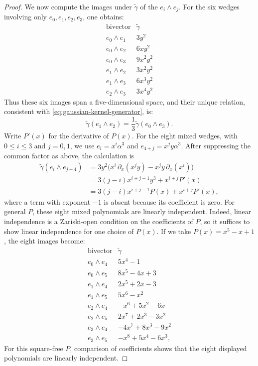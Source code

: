 \documentclass[11pt]{article}
\begin{document}
\begin{proof}
We now compute the images under $\widetilde \gamma$ of the $e_i \wedge e_j$.
For the six wedges involving only $e_0,e_1,e_2,e_3$, one obtains:
\begin{equation*}
\begin{array}{c|c}
\text{bivector} & \widetilde\gamma \\ \hline
 e_0\wedge e_1 & 3y^2 \\
 e_0\wedge e_2 & 6xy^2 \\
 e_0\wedge e_3 & 9x^2y^2 \\
 e_1\wedge e_2 & 3x^2y^2 \\
 e_1\wedge e_3 & 6x^3y^2 \\
 e_2\wedge e_3 & 3x^4y^2
\end{array}
\end{equation*}
Thus these six images span a five-dimensional space, and their unique relation,
consistent with \eqref{eq:gaussian-kernel-generator}, is:
\begin{equation*}
\widetilde\gamma(e_1\wedge e_2)
=\frac13\widetilde\gamma(e_0\wedge e_3).
\end{equation*}
Write $P'(x)$ for the derivative of $P(x)$.  For the eight mixed wedges,
with $0\leq i\leq3$ and $j=0,1$, we use
$e_i=x^i\alpha^3$ and $e_{4+j}=x^jy\alpha^3$.  After suppressing the
common factor as above, the calculation is
\begin{equation}
\label{eq:mixed-gaussian-general-P}
\begin{aligned}
\widetilde\gamma (e_i \wedge e_{j+4})
&=
3y^2\bigl(x^i\,\partial_x(x^jy)-x^jy\,\partial_x(x^i)\bigr) \\
&=
3(j-i)x^{i+j-1}y^3+x^{i+j}P'(x) \\
&=
3(j-i)x^{i+j-1}P(x)+x^{i+j}P'(x),
\end{aligned}
\end{equation}
where a term with exponent $-1$ is absent because its coefficient is zero.  For general $P$, these eight {mixed} polynomials are linearly independent.  Indeed, linear independence is a Zariski-open condition on the coefficients of $P$, so it suffices to show linear independence for one {choice} of $P(x)$. If we take $P(x)=x^5-x+1$, the eight images become:
\begin{equation*}
\begin{array}{c|l}
\text{bivector} & \widetilde\gamma \\ \hline
 e_0\wedge e_4 & 5x^4-1 \\
 e_0\wedge e_5 & 8x^5-4x+3 \\
 e_1\wedge e_4 & 2x^5+2x-3 \\
 e_1\wedge e_5 & 5x^6-x^2 \\
 e_2\wedge e_4 & -x^6+5x^2-6x \\
 e_2\wedge e_5 & 2x^7+2x^3-3x^2 \\
 e_3\wedge e_4 & -4x^7+8x^3-9x^2 \\
 e_3\wedge e_5 & -x^8+5x^4-6x^3,
\end{array}
\end{equation*}
{For this square-free $P$, comparison of coefficients shows that
the eight displayed polynomials are linearly independent.}


\end{proof}
\end{document}

